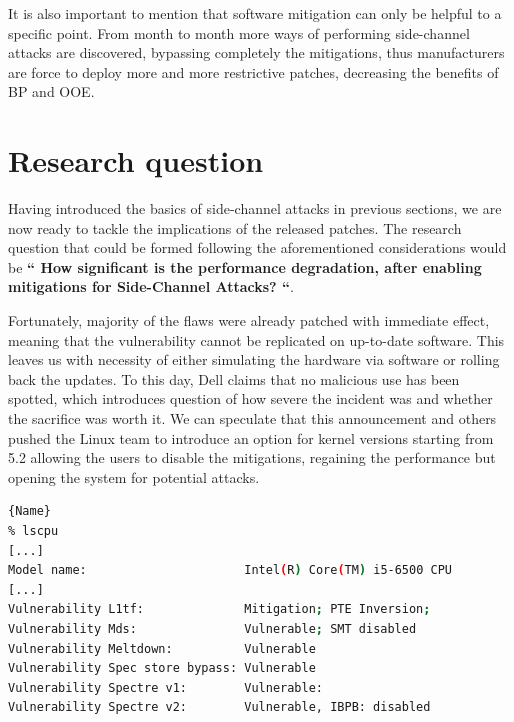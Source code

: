 \documentclass{csfourzero}
\begin{document}
It is also important to mention that software mitigation can only be helpful to a specific point. From month to month more ways of performing side-channel attacks are discovered, bypassing completely the mitigations, thus manufacturers are force to deploy more and more restrictive patches, decreasing the benefits of BP and OOE.


\section{Research question}
\label{sec:rq}
Having introduced the basics of side-channel attacks in previous sections, we are now ready to tackle the implications of the released patches. The research question that could be formed following the aforementioned considerations would be \textbf{`` How significant is the performance degradation, after enabling mitigations for Side-Channel Attacks? ``}. 

Fortunately, majority of the flaws were already patched with immediate effect, meaning that the vulnerability cannot be replicated on up-to-date software. This leaves us with necessity of either simulating the hardware via software or rolling back the updates. To this day, Dell claims that no malicious use has been spotted\cite{dell}, which introduces question of how severe the incident was and whether the sacrifice was worth it. We can speculate that this announcement and others pushed the Linux team to introduce an option for kernel versions starting from 5.2 allowing the users to disable the mitigations, regaining the performance but opening the system for potential attacks.  

\begin{lstlisting}[caption=Vulnerable Linux system with disabled mitigations,frame=tlrb,language=bash]{Name}
% lscpu            
[...]
Model name:                      Intel(R) Core(TM) i5-6500 CPU 
[...]
Vulnerability L1tf:              Mitigation; PTE Inversion;
Vulnerability Mds:               Vulnerable; SMT disabled
Vulnerability Meltdown:          Vulnerable
Vulnerability Spec store bypass: Vulnerable
Vulnerability Spectre v1:        Vulnerable:
Vulnerability Spectre v2:        Vulnerable, IBPB: disabled
\end{lstlisting}
\end{document}
